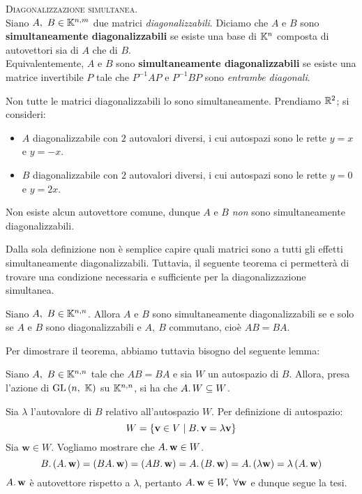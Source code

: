 \begin{define}\textsc{Diagonalizzazione simultanea}.\\
	Siano $A,\ B\in\mathbb{K}^{n, m}$ due matrici \textit{diagonalizzabili}. Diciamo che $A$ e $B$ sono \textbf{simultaneamente diagonalizzabili} se esiste una base di $\mathbb{K}^n$ composta di autovettori sia di $A$ che di $B$.\\
	Equivalentemente, $A$ e $B$ sono \textbf{simultaneamente diagonalizzabili} se esiste una matrice invertibile $P$ tale che $P^{-1}AP$ e $P^{-1}BP$ sono \textit{entrambe diagonali}.
\end{define}
\begin{example}
	Non tutte le matrici diagonalizzabili lo sono simultaneamente. Prendiamo $\mathbb{R}^2$; si consideri:
	\begin{itemize}
		\item $A$ diagonalizzabile con $2$ autovalori diversi, i cui autospazi sono le rette $y=x$ e $y=-x$.
		\item $B$ diagonalizzabile con $2$ autovalori diversi, i cui autospazi sono le rette $y=0$ e $y=2x$.
	\end{itemize}
Non esiste alcun autovettore comune, dunque $A$ e $B$ \textit{non} sono simultaneamente diagonalizzabili.
\end{example}
Dalla sola definizione non è semplice capire quali matrici sono a tutti gli effetti simultaneamente diagonalizzabili. Tuttavia, il seguente teorema ci permetterà di trovare una condizione necessaria e sufficiente per la diagonalizzazione simultanea.
\begin{theorema}\label{teoremasimdiag}
	Siano $A,\ B\in\mathbb{K}^{n, n}$. Allora $A$ e $B$ sono simultaneamente diagonalizzabili se e solo se $A$ e $ B$ sono diagonalizzabili e $A,\ B$ commutano, cioè $AB=BA$.
\end{theorema}
Per dimostrare il teorema, abbiamo tuttavia bisogno del seguente lemma:
\begin{lemming}
	Siano $A,\ B\in\mathbb{K}^{n, n}$ tale che $AB=BA$ e sia $W$ un autospazio di $B$. Allora, presa l'azione di $\gl\left(n,\ \kamp\right)$ su $\mathbb{K}^{n, n}$, si ha che $A\ldotp W\subseteq W$.
\end{lemming}
\begin{demonstration}
	Sia $\lambda$ l'autovalore di $B$ relativo all'autospazio $W$. Per definizione di autospazio:
	\begin{equation*}
		W=\left\{\mathbf{v}\in V\mid B\ldotp \mathbf{v}=\lambda \mathbf{v}\right\}
	\end{equation*}
Sia $\mathbf{w}\in W$. Vogliamo mostrare che $A\ldotp \mathbf{w}\in W$.
\begin{equation*}
	B\ldotp\left(A\ldotp\mathbf{w}\right)=\left(BA\ldotp\mathbf{w}\right)=\left(AB\ldotp\mathbf{w}\right)=A\ldotp\left(B\ldotp\mathbf{w}\right)=A\ldotp\left(\lambda\mathbf{w}\right)=\lambda\left(A\ldotp\mathbf{w}\right)
\end{equation*}
$A\ldotp \mathbf{w}$ è autovettore rispetto a $\lambda$, pertanto $A\ldotp \mathbf{w}\in W,\ \forall \mathbf{w}$ e dunque segue la tesi.
\end{demonstration}
